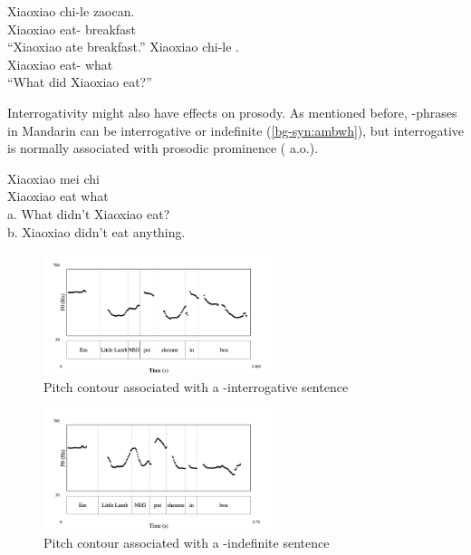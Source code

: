 \gll Xiaoxiao	chi-le zaocan.\\
Xiaoxiao eat-\Asp{} breakfast \\
``Xiaoxiao ate breakfast.''
\eex
{}
\gll Xiaoxiao	chi-le .\\
Xiaoxiao eat-\Asp{} what \\
``What did Xiaoxiao eat?''
\eex


Interrogativity might also have effects on prosody. As mentioned before, \twh-phrases in Mandarin can be interrogative or indefinite (\ref{bg-syn:ambwh}), but interrogative \twh{} is normally associated with prosodic prominence (\cite{hu2002prosody, dong2009, yangyang2018} a.o.).

\gll Xiaoxiao	mei	chi	\\
Xiaoxiao	\Neg{}	eat	what\\
a.	What didn't Xiaoxiao eat?\\
b.	Xiaoxiao didn't eat anything.\\
\eex

\begin{figure}[H]
    \centering
    \includegraphics[width=0.6\textwidth]{figures/pitch-FC1wh.jpg}
    \caption{Pitch contour associated with a \twh-interrogative sentence}
    \label{fig:man:wh1}
\end{figure}

\begin{figure}[H]
    \centering
    \includegraphics[width=0.6\textwidth]{figures/pitch-FC0wh.jpg}
    \caption{Pitch contour associated with a \twh-indefinite sentence}
    \label{fig:man:wh0}
\end{figure}

